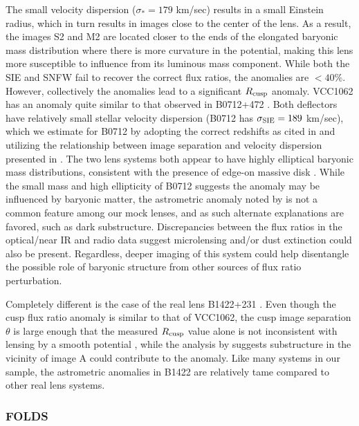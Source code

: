\begin{itemize}
	\vspace{1cm}  The small velocity dispersion ($\sigma_* = 179$ km/sec) results in a small Einstein radius, which in turn results in images close to the center of the lens. As a result, the images S2 and M2 are located closer to the ends of the elongated baryonic mass distribution where there is more curvature in the potential, making this lens more susceptible to influence from its luminous mass component. While both the SIE and SNFW fail to recover the correct flux ratios, the anomalies are $<40\%$. However, collectively the anomalies lead to a significant $R_{\rm{cusp}}$ anomaly. VCC1062 has an anomaly quite similar to that observed in B0712+472 \cite{Jackson++98}. Both deflectors have relatively small stellar velocity dispersion (B0712 has $\sigma_{\rm{SIE}} = 189$ km/sec), which we estimate for B0712 by adopting the correct redshifts as cited in \cite{Sluse++12} and utilizing the relationship between image separation and velocity dispersion presented in \cite{Kochanek++00}. The two lens systems both appear to have highly elliptical baryonic mass distributions, consistent with the presence of edge-on massive disk \cite{Jackson++98}. While the small mass and high ellipticity of B0712 suggests the anomaly may be influenced by baryonic matter, the astrometric anomaly noted by \cite{Kawano++04} is not a common feature among our mock lenses, and as such alternate explanations are favored, such as dark substructure. Discrepancies between the flux ratios in the optical/near IR and radio data suggest microlensing and/or dust extinction could also be present. Regardless, deeper imaging of this system could help disentangle the possible role of baryonic structure from other sources of flux ratio perturbation. 
	
	\vspace{1cm} Completely different is the case of the real lens B1422+231 \cite{Patnaik++92}. Even though the cusp flux ratio anomaly is similar to that of VCC1062, the cusp image separation $\theta$ is large enough that the measured $R_{\rm{cusp}}$ value \cite{Koopmans++03} alone is not inconsistent with lensing by a smooth potential \cite{Keeton03}, while the analysis by \cite{Nierenberg++14,Xu++15} suggests substructure in the vicinity of image A could contribute to the anomaly. Like many systems in our sample, the astrometric anomalies in B1422 are relatively tame compared to other real lens systems.
\end{itemize}
\subsubsection{\rm{FOLDS}}

